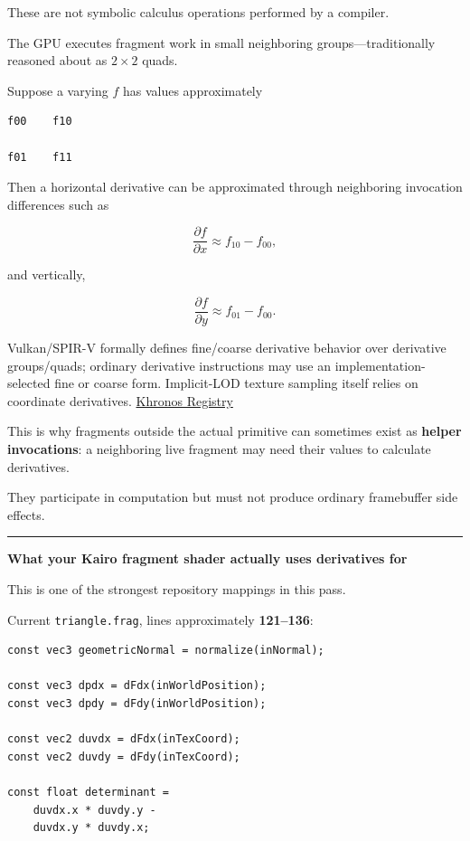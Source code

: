 These are not symbolic calculus operations performed by a compiler.

The GPU executes fragment work in small neighboring groups---traditionally reasoned about as \(2\times2\) quads.

Suppose a varying \(f\) has values approximately

\begin{verbatim}
f00    f10

f01    f11
\end{verbatim}

Then a horizontal derivative can be approximated through neighboring invocation differences such as

\[
\frac{\partial f}{\partial x}
\approx
f_{10}-f_{00},
\]

and vertically,

\[
\frac{\partial f}{\partial y}
\approx
f_{01}-f_{00}.
\]

Vulkan/SPIR-V formally defines fine/coarse derivative behavior over derivative groups/quads; ordinary derivative instructions may use an implementation-selected fine or coarse form. Implicit-LOD texture sampling itself relies on coordinate derivatives. \href{https://registry.khronos.org/vulkan/specs/latest/pdf/vkspec.pdf?utm_source=chatgpt.com}{Khronos Registry}

This is why fragments outside the actual primitive can sometimes exist as \textbf{helper invocations}: a neighboring live fragment may need their values to calculate derivatives.

They participate in computation but must not produce ordinary framebuffer side effects.

\begin{center}\rule{0.5\linewidth}{0.5pt}\end{center}

\textbf{What your Kairo fragment shader actually uses derivatives for}

This is one of the strongest repository mappings in this pass.

Current \texttt{triangle.frag}, lines approximately \textbf{121--136}:

\begin{verbatim}
const vec3 geometricNormal = normalize(inNormal);

const vec3 dpdx = dFdx(inWorldPosition);
const vec3 dpdy = dFdy(inWorldPosition);

const vec2 duvdx = dFdx(inTexCoord);
const vec2 duvdy = dFdy(inTexCoord);

const float determinant =
    duvdx.x * duvdy.y -
    duvdx.y * duvdy.x;
\end{verbatim}

